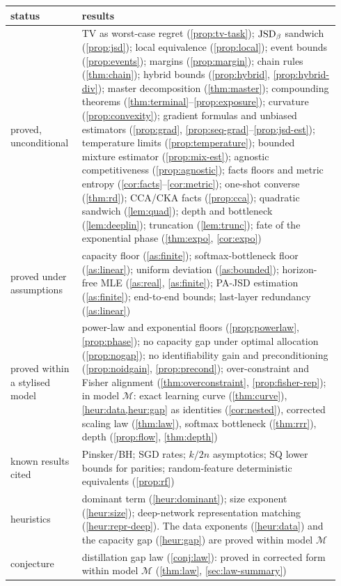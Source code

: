 \begin{center}
\begin{tabular}{@{}p{0.2\linewidth}p{0.74\linewidth}@{}}
\toprule
status & results\\\midrule
proved, unconditional & TV as worst-case regret (\ref{prop:tv-task}); $\mathrm{JSD}_\beta$ sandwich (\ref{prop:jsd}); local equivalence (\ref{prop:local}); event bounds (\ref{prop:events}); margins (\ref{prop:margin}); chain rules (\ref{thm:chain}); hybrid bounds (\ref{prop:hybrid}, \ref{prop:hybrid-div}); master decomposition (\ref{thm:master}); compounding theorems (\ref{thm:terminal}--\ref{prop:exposure}); curvature (\ref{prop:convexity}); gradient formulas and unbiased estimators (\ref{prop:grad}, \ref{prop:seq-grad}--\ref{prop:jsd-est}); temperature limits (\ref{prop:temperature}); bounded mixture estimator (\ref{prop:mix-est}); agnostic competitiveness (\ref{prop:agnostic}); facts floors and metric entropy (\ref{cor:facts}--\ref{cor:metric}); one-shot converse (\ref{thm:rd}); CCA/CKA facts (\ref{prop:cca}); quadratic sandwich (\ref{lem:quad}); depth and bottleneck (\ref{lem:deeplin}); truncation (\ref{lem:trunc}); fate of the exponential phase (\ref{thm:expo}, \ref{cor:expo})\\
proved under assumptions & capacity floor (\ref{as:finite}); softmax-bottleneck floor (\ref{as:linear}); uniform deviation (\ref{as:bounded}); horizon-free MLE (\ref{as:real}, \ref{as:finite}); PA-JSD estimation (\ref{as:finite}); end-to-end bounds; last-layer redundancy (\ref{as:linear})\\
proved within a stylised model & power-law and exponential floors (\ref{prop:powerlaw}, \ref{prop:phase}); no capacity gap under optimal allocation (\ref{prop:nogap}); no identifiability gain and preconditioning (\ref{prop:noidgain}, \ref{prop:precond}); over-constraint and Fisher alignment (\ref{thm:overconstraint}, \ref{prop:fisher-rep}); in model $\mathcal M$: exact learning curve (\ref{thm:curve}), \cref{heur:data,heur:gap} as identities (\ref{cor:nested}), corrected scaling law (\ref{thm:law}), softmax bottleneck (\ref{thm:rrr}), depth (\ref{prop:flow}, \ref{thm:depth})\\
known results cited & Pinsker/BH; SGD rates; $k/2n$ asymptotics; SQ lower bounds for parities; random-feature deterministic equivalents (\ref{prop:rf})\\
heuristics & dominant term (\ref{heur:dominant}); size exponent (\ref{heur:size}); deep-network representation matching (\ref{heur:repr-deep}). The data exponents (\ref{heur:data}) and the capacity gap (\ref{heur:gap}) are proved within model $\mathcal M$\\
conjecture & distillation gap law (\ref{conj:law}): proved in corrected form within model $\mathcal M$ (\ref{thm:law}, \cref{sec:law-summary})\\\bottomrule
\end{tabular}
\end{center}

